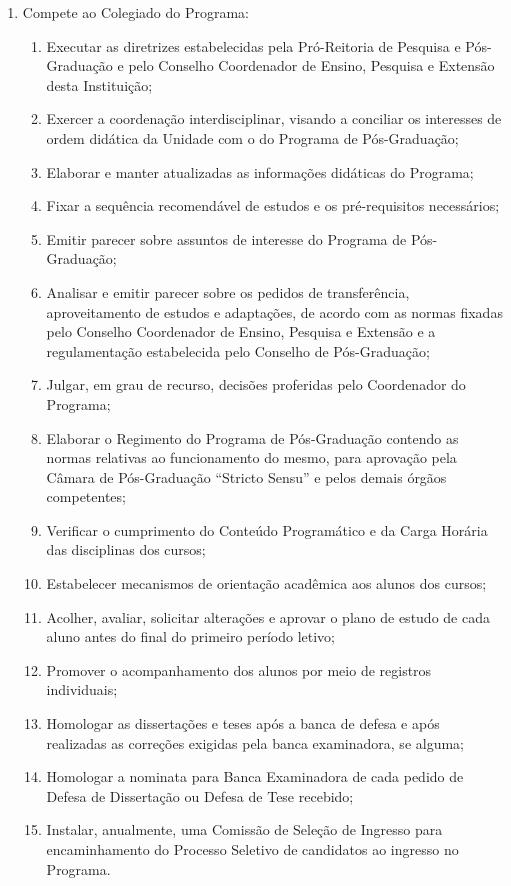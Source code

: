 \documentclass{article}
\begin{document}
\begin{enumerate}
	\item Compete ao Colegiado do Programa:
	\begin{enumerate}[label=\Roman*]
		\item Executar as diretrizes estabelecidas pela Pró-Reitoria de Pesquisa e Pós-Graduação e pelo Conselho Coordenador de Ensino, Pesquisa e Extensão desta Instituição;
		\item Exercer a coordenação interdisciplinar, visando a conciliar os interesses de ordem didática da Unidade com o do Programa de Pós-Graduação;
		\item Elaborar e manter atualizadas as informações didáticas do Programa;
		\item Fixar a sequência recomendável de estudos e os pré-requisitos necessários;
		\item Emitir parecer sobre assuntos de interesse do Programa de Pós-Graduação;
		\item Analisar e emitir parecer sobre os pedidos de transferência, aproveitamento de estudos e adaptações, de acordo com as normas fixadas pelo Conselho Coordenador de Ensino, Pesquisa e Extensão e a regulamentação estabelecida pelo Conselho de Pós-Graduação;
		\item Julgar, em grau de recurso, decisões proferidas pelo Coordenador do Programa;
		\item Elaborar o Regimento do Programa de Pós-Graduação contendo as normas relativas ao funcionamento do mesmo, para aprovação pela Câmara de Pós-Graduação ``Stricto Sensu'' e pelos demais órgãos competentes;
		\item Verificar o cumprimento do Conteúdo Programático e da Carga Horária das disciplinas dos cursos; %
		\item Estabelecer mecanismos de orientação acadêmica aos alunos dos cursos;
		\item Acolher, avaliar, solicitar alterações e aprovar o plano de estudo de cada aluno antes do final do primeiro período letivo; 
		\item Promover o acompanhamento dos alunos por meio de registros individuais;
		\item Homologar as dissertações e teses após a banca de defesa e após realizadas as correções exigidas pela banca examinadora, se alguma;
		\item Homologar a nominata para Banca Examinadora de cada pedido de Defesa de Dissertação ou Defesa de Tese recebido;
		\item Instalar, anualmente, uma Comissão de Seleção de Ingresso para encaminhamento do Processo Seletivo de candidatos ao ingresso no Programa.

\end{enumerate}
\end{enumerate}
\end{document}
